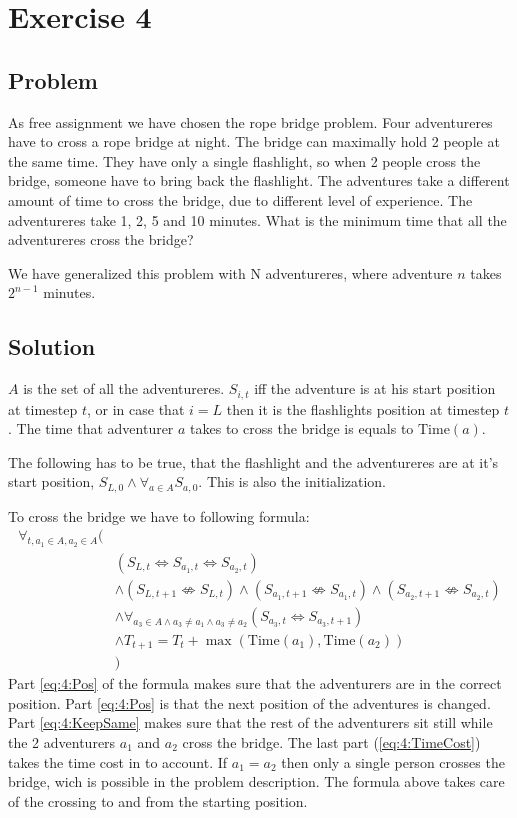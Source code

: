 \chapter{Exercise 4}
\section{Problem}
As free assignment we have chosen the rope bridge problem\cite{RopBridge}. Four adventureres have to cross a rope bridge at night. The bridge can maximally hold 2 people at the same time. They have only a single flashlight, so when 2 people cross the bridge, someone have to bring back the flashlight. The adventures take a different amount of time to cross the bridge, due to different level of experience. The adventureres take 1, 2, 5 and 10 minutes. What is the minimum time that all the adventureres cross the bridge?

We have generalized this problem with N adventureres, where adventure $n$ takes $2^{n-1}$ minutes.

\section{Solution}
$A$ is the set of all the adventureres. $S_{i, t}$ iff the adventure is at his start position at timestep $t$, or in case that $i=L$ then it is the flashlights position at timestep $t$. The time that adventurer $a$ takes to cross the bridge is equals to $\text{Time}(a)$.

The following has to be true, that the flashlight and the adventureres are at it's start position, $S_{L,0} \land \forall_{a \in A} S_{a,0}$. This is also the initialization.

To cross the bridge we have to following formula:
\begin{align}
\forall_{t, a_1\in A, a_2\in A} (& \nonumber \\
&(S_{L, t} \Leftrightarrow S_{a_1, t} \Leftrightarrow S_{a_2, t})  \label{eq:4:Pos} \\
& \land (S_{L, t+1} \not\Leftrightarrow S_{L, t}) \land (S_{a_1, t+1} \not\Leftrightarrow S_{a_1, t}) \land (S_{a_2, t+1} \not\Leftrightarrow S_{a_2, t}) \label{eq:4:NestPos} \\
& \land \forall_{a_3 \in A \land a_3 \not = a_1 \land a_3 \not= a_2}(S_{a_3, t} \Leftrightarrow S_{a_3, t+1})\label{eq:4:KeepSame}  \\ 
& \land T_{t+1} = T_{t} + \max(\text{Time}(a_1), \text{Time}(a_2)) \label{eq:4:TimeCost} \\
&)\nonumber
\end{align}
Part \ref{eq:4:Pos} of the formula makes sure that the adventurers are in the correct position. Part \ref{eq:4:Pos} is that the next position of the adventures is changed. Part \ref{eq:4:KeepSame} makes sure that the rest of the adventurers sit still while the 2 adventurers $a_1$ and $a_2$ cross the bridge. The last part (\ref{eq:4:TimeCost}) takes the time cost in to account. If $a_1 = a_2$ then only a single person crosses the bridge, wich is possible in the problem description. The formula above takes care of the crossing to and from the starting position.

